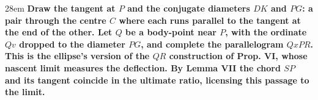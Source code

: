 \documentclass[border=4pt]{standalone}
\begin{document}
\begin{varwidth}{28em}
\large\bfseries
Draw the tangent at $P$ and the conjugate diameters $DK$ and $PG$: a      pair through the centre $C$ where each runs parallel to the tangent at the end      of the other. Let $Q$ be a body-point near $P$, with the ordinate $Qv$ dropped      to the diameter $PG$, and complete the parallelogram $QxPR$. This is      the ellipse's version of the $QR$ construction of Prop. VI, whose nascent limit      measures the deflection. By Lemma VII the chord $SP$ and its tangent      coincide in the ultimate ratio, licensing this passage to the limit.
\end{varwidth}
\end{document}

